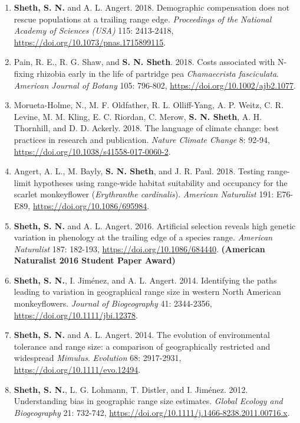 \documentclass[11pt,english]{article}\usepackage[]{graphicx}\usepackage[]{xcolor}
\begin{document}
\begin{hangparas}{.5in}{1}
\begin{enumerate}
\item \textbf{Sheth, S. N.} and A. L. Angert. 2018. Demographic compensation does not rescue populations at a trailing range edge. \emph{Proceedings of the National Academy of Sciences (USA)} 115: 2413-2418, \url{https://doi.org/10.1073/pnas.1715899115}. 

\item Pain, R. E., R. G. Shaw, and \textbf{S. N. Sheth}. 2018. Costs associated with N-fixing rhizobia early in the life of partridge pea \textit{Chamaecrista fasciculata}. \emph{American Journal of Botany} 105: 796-802, \url{https://doi.org/10.1002/ajb2.1077}. 

\item Morueta-Holme, N., M. F. Oldfather, R. L. Olliff-Yang, A. P. Weitz, C. R. Levine, M. M. Kling, E. C. Riordan, C. Merow, \textbf{S. N. Sheth}, A. H. Thornhill, and D. D. Ackerly. 2018. The language of climate change: best practices in research and publication. \emph{Nature Climate Change} 8: 92-94, \url{https://doi.org/10.1038/s41558-017-0060-2}.

\item Angert, A. L., M. Bayly, \textbf{S. N. Sheth}, and J. R. Paul. 2018. Testing range-limit hypotheses using range-wide habitat suitability and occupancy for the scarlet monkeyflower (\textit{Erythranthe cardinalis}). \emph{American Naturalist} 191: E76-E89, \url{https://doi.org/10.1086/695984}.

 \item \textbf{Sheth, S. N.} and A. L. Angert. 2016. Artificial selection reveals high genetic variation in phenology at the trailing edge of a species range. \emph{American Naturalist} 187: 182-193, \url{https://doi.org/10.1086/684440}. \textbf{(American Naturalist 2016 Student Paper Award)} 
 
\item \textbf{Sheth, S. N.}, I. Jim\'enez, and A. L. Angert. 2014. Identifying the paths leading to variation in geographical range size in western North American monkeyflowers. \emph{Journal of Biogeography} 41: 2344-2356, \url{https://doi.org/10.1111/jbi.12378}. 

\item \textbf{Sheth, S. N.} and A. L. Angert. 2014. The evolution of environmental tolerance and range size: a comparison of geographically restricted and widespread \textit{Mimulus}. \emph{Evolution} 68: 2917-2931, \url{https://doi.org/10.1111/evo.12494}. 

\item \textbf{Sheth, S. N.}, L. G. Lohmann, T. Distler, and I. Jim\'enez. 2012. Understanding bias in geographic range size estimates. \emph{Global Ecology and Biogeography} 21: 732-742, \url{https://doi.org/10.1111/j.1466-8238.2011.00716.x}.
 

\end{enumerate}
\end{hangparas}
\end{document}
